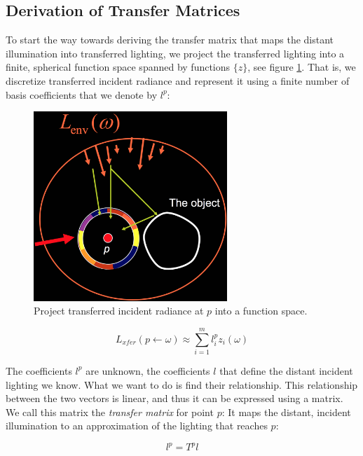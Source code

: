 \subsection{Derivation of Transfer Matrices}
To start the way towards deriving the transfer matrix that maps the distant illumination into transferred lighting, we project the transferred lighting into a finite, spherical function space spanned by functions $\{z\}$, see figure \ref{f:prt-tir-projection}. That is, we discretize transferred incident radiance and represent it using a finite number of basis coefficients that we denote by $l^{p}$:

\begin{figure}
\sidecaption
	\includegraphics[width=0.65\textwidth]{graphics/prt/prt-10}
	\caption{Project transferred incident radiance at $p$ into a function space.}
	\label{f:prt-tir-projection}
\end{figure}

\begin{equation*}
	L_{xfer}(p\leftarrow\omega)\approx\sum^{m}_{i=1}l^{p}_{i}z_i(\omega)
\end{equation*}

The coefficients $l^{p}$ are unknown, the coefficients $l$ that define the distant incident lighting we know. What we want to do is find their relationship. This relationship between the two vectors is linear, and thus it can be expressed using a matrix. We call this matrix the \textit{transfer matrix} for point $p$: It maps the distant, incident illumination to an approximation of the lighting that reaches $p$:

\begin{equation*}
	l^{p}=T^{p}l
\end{equation*} 

